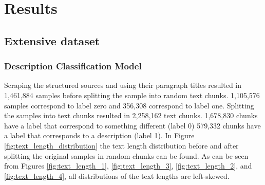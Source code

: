 \documentclass[a4paper, 12pt, oneside]{book} %
\begin{document}
\newpage
\section{Results} \label{par:results}
\subsection{Extensive dataset}
\subsubsection{Description Classification Model}
Scraping the structured sources and using their paragraph titles resulted in 1,461,884 samples before splitting the sample into random text chunks.
1,105,576 samples correspond to label zero and 356,308 correspond to label one.
Splitting the samples into text chunks resulted in 2,258,162 text chunks.
1,678,830 chunks have a label that correspond to something different (label 0) 579,332 chunks have a label that corresponds to a description (label 1).
In Figure \ref{fig:text_length_distribution} the text length distribution before and after splitting the original samples in random chunks can be found.
As can be seen from Figures \ref{fig:text_length_1}, \ref{fig:text_length_3}, \ref{fig:text_length_2}, and \ref{fig:text_length_4}, all distributions of the text lengths are left-skewed. 
\end{document}
